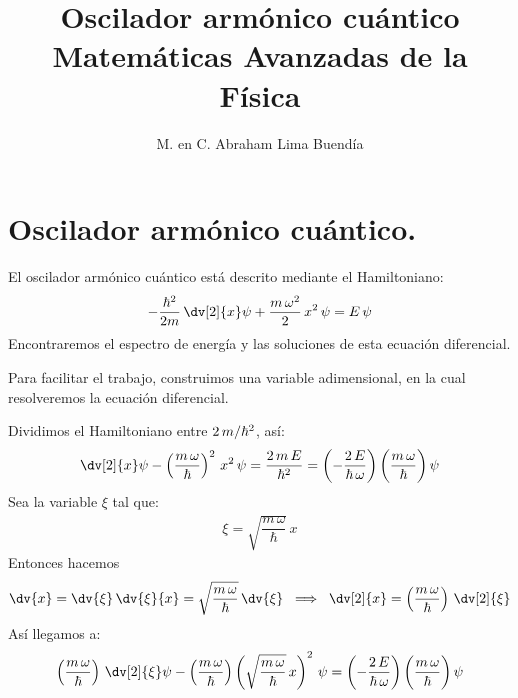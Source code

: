 
\title{Oscilador armónico cuántico\\ \large{Matemáticas Avanzadas de la Física}\vspace{-3ex}}
\author{M. en C. Abraham Lima Buendía}
\date{ }

\vspace{-4cm}
\maketitle
\fontsize{14}{14}\selectfont
\section{Oscilador armónico cuántico.}

El oscilador armónico cuántico está descrito mediante el Hamiltoniano:
\begin{align*}
- \dfrac{\hbar^{2}}{2 m} \, \dv[2]{x} \psi + \dfrac{m \, \omega^{2}}{2} \, x^{2} \, \psi
 = E \, \psi
\end{align*}
Encontraremos el espectro de energía y las soluciones de esta ecuación diferencial.
\par
Para facilitar el trabajo, construimos una variable adimensional, en la cual resolveremos la ecuación diferencial.
\par
Dividimos el Hamiltoniano entre $\- 2 \, m/ \hbar^{2}$, así:
\begin{align*}
\dv[2]{x} \psi - \left( \dfrac{m \, \omega}{\hbar} \right)^{2} \, x^{2} \, \psi =  \dfrac{2 \, m \, E}{\hbar^{2}} = \left( - \dfrac{2 \, E}{\hbar \, \omega} \right) \bigg( \dfrac{m \, \omega}{\hbar} \bigg) \, \psi
\end{align*}
Sea la variable $\xi$ tal que:
\begin{align*}
\xi = \sqrt{\dfrac{m \, \omega}{\hbar}} \, x
\end{align*}
Entonces hacemos
\begin{align*}
\dv{x} = \dv{\xi} \, \dv{\xi}{x} = \sqrt{\dfrac{m \, \omega}{\hbar}} \, \dv{\xi} \hspace{0.2cm} \Longrightarrow \hspace{0.2cm} \dv[2]{x} = \left( \dfrac{m \, \omega}{\hbar} \right) \, \dv[2]{\xi}
\end{align*}
Así llegamos a:
\begin{align*}
\left( \dfrac{m \, \omega}{\hbar} \right) \, \dv[2]{\xi} \psi - \left( \dfrac{m \, \omega}{\hbar} \right) \left( \sqrt{\dfrac{m \, \omega}{\hbar}} \, x \right)^{2} \, \psi = \left( - \dfrac{2 \, E}{\hbar \, \omega} \right) \bigg( \dfrac{m \, \omega}{\hbar} \bigg) \, \psi
\end{align*}
